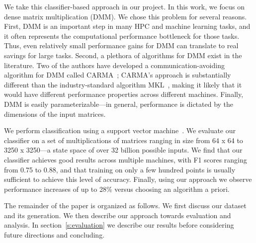 We take this classifier-based approach in our project.
In this work, we focus on dense matrix multiplication (DMM).
We chose this problem for several reasons.
First, DMM is an important step in many HPC and machine learning tasks, and it often represents the computational performance bottleneck for those tasks.
Thus, even relatively small performance gains for DMM can translate to real savings for large tasks.
Second, a plethora of algorithms for DMM exist in the literature.
Two of the authors have developed a communication-avoiding algorithm for DMM called CARMA~\cite{demmel2013communication}; CARMA's approach is substantially different than the industry-standard algorithm MKL~\cite{intel2007intel}, making it likely that it would have different performance properties across different machines.
Finally, DMM is easily parameterizable---in general, performance is dictated by the dimensions of the input matrices.

We perform classification using a support vector machine~\cite{cortes1995support}.
We evaluate our classifier on a set of multiplications of matrices ranging in size from 64 x 64 to 3250 x 3250---a state space of over 32 billion possible inputs.
We find that our classifier achieves good results across multiple machines, with F1 scores ranging from 0.75 to 0.88, and that training on only a few hundred points is usually sufficient to achieve this level of accuracy.
Finally, using our approach we observe performance increases of up to 28\% versus choosing an algorithm a priori.

The remainder of the paper is organized as follows.
We first discuss our dataset and its generation.
We then describe our approach towards evaluation and analysis.
In section~\ref{s:evaluation} we describe our results before considering future directions and concluding.
